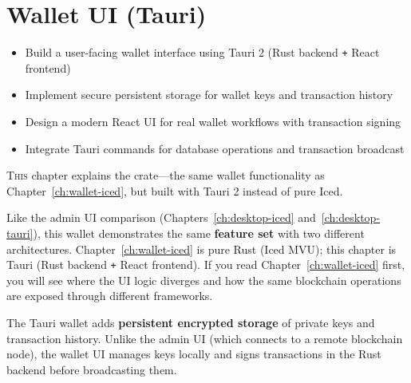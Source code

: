 \chapter{Wallet UI (Tauri)}
\label{ch:wallet-tauri}

\begin{learnbox}
\begin{itemize}
  \item Build a user-facing wallet interface using Tauri 2 (Rust backend \texttt{+} React frontend)
  \item Implement secure persistent storage for wallet keys and transaction history
  \item Design a modern React UI for real wallet workflows with transaction signing
  \item Integrate Tauri commands for database operations and transaction broadcast
\end{itemize}
\end{learnbox}

\lettrine{T}{his} chapter explains the  crate---the same wallet functionality as Chapter~\ref{ch:wallet-iced}, but built with Tauri 2 instead of pure Iced.

\begin{notebox}[Architecture]
Like the admin UI comparison (Chapters~\ref{ch:desktop-iced} and~\ref{ch:desktop-tauri}), this wallet demonstrates the same \textbf{feature set} with two different architectures. Chapter~\ref{ch:wallet-iced} is pure Rust (Iced MVU); this chapter is Tauri (Rust backend \texttt{+} React frontend). If you read Chapter~\ref{ch:wallet-iced} first, you will see where the UI logic diverges and how the same blockchain operations are exposed through different frameworks.
\end{notebox}

The Tauri wallet adds \textbf{persistent encrypted storage} of private keys and transaction history. Unlike the admin UI (which connects to a remote blockchain node), the wallet UI manages keys locally and signs transactions in the Rust backend before broadcasting them.

